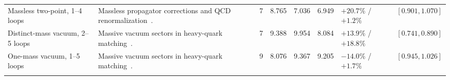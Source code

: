 \begin{landscape}
\begin{longtable}{@{}>{\raggedright\arraybackslash}p{3.8cm}>{\raggedright\arraybackslash}p{4.4cm}rrrr>{\raggedright\arraybackslash}p{3.1cm}>{\raggedright\arraybackslash}p{3.1cm}@{}}
Massless two-point, 1--4 loops & Massless propagator corrections and QCD renormalization~\cite{Ruijl2017Forcer}. & 7 & 8.765 & 7.036 & 6.949 & $+20.7\%$ / $+1.2\%$ & $[0.901,1.070]$ \\ \addlinespace[3pt]
Distinct-mass vacuum, 2--5 loops & Massive vacuum sectors in heavy-quark matching~\cite{SchroderSteinhauser2006}. & 7 & 9.388 & 9.954 & 8.084 & $+13.9\%$ / $+18.8\%$ & $[0.741,0.890]$ \\ \addlinespace[3pt]
One-mass vacuum, 1--5 loops & Massive vacuum sectors in heavy-quark matching~\cite{SchroderSteinhauser2006}. & 9 & 8.076 & 9.367 & 9.205 & $-14.0\%$ / $+1.7\%$ & $[0.945,1.026]$ \\ \addlinespace[3pt]
\end{longtable}
\end{landscape}
